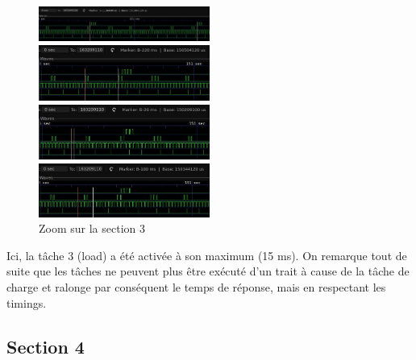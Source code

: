 \documentclass[11pt, a4paper]{article}
\begin{document}
\begin{figure}[H]
    \begin{multicols}{2}
        \begin{center}
            \includegraphics[width=0.5\textwidth]{section3_load_t1_light}
        \end{center}
        \columnbreak
        \begin{center}
            \includegraphics[width=0.5\textwidth]{section3_load_t2_cmd}
        \end{center}
    \end{multicols}
    \begin{multicols}{2}
        \begin{center}
            \includegraphics[width=0.5\textwidth]{section3_load_t3_load}
        \end{center}
        \columnbreak
        \begin{center}
            \includegraphics[width=0.5\textwidth]{section3_load_t4_leds}
        \end{center}
    \end{multicols}
    \caption{Zoom sur la section 3}
    \label{Zoom sur la section 3}
\end{figure}

Ici, la tâche 3 (load) a été activée à son maximum (15 ms).
On remarque tout de suite que les tâches ne peuvent plus être exécuté d'un trait à cause de la tâche de charge et
ralonge par conséquent le temps de réponse, mais en respectant les timings.

\subsection{Section 4}
\end{document}
